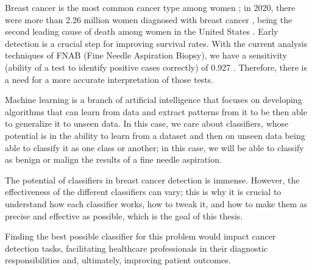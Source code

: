 Breast cancer is the most common cancer type among women \cite{wcrf_international_breast_nodate}; in 2020, there were more than 2.26 million women diagnosed with breast cancer \cite{wcrf_international_breast_nodate}, being the second leading cause of death among women in the United States \cite{american_cancer_society_breast_nodate}. Early detection is a crucial step for improving survival rates. With the current analysis techniques of FNAB (Fine Needle Aspiration Biopsy), we have a sensitivity (ability of a test to identify positive cases correctly) of 0.927 \cite{yu_diagnostic_2012}. Therefore, there is a need for a more accurate interpretation of those tests.

Machine learning is a branch of artificial intelligence that focuses on developing algorithms that can learn from data and extract patterns from it to be then able to generalize it to unseen data. In this case, we care about classifiers, whose potential is in the ability to learn from a dataset and then on unseen data being able to classify it as one class or another; in this case, we will be able to classify as benign or malign the results of a fine needle aspiration.

The potential of classifiers in breast cancer detection is immense. However, the effectiveness of the different classifiers can vary; this is why it is crucial to understand how each classifier works, how to tweak it, and how to make them as precise and effective as possible, which is the goal of this thesis.

Finding the best possible classifier for this problem would impact cancer detection tasks, facilitating healthcare professionals in their diagnostic responsibilities and, ultimately, improving patient outcomes.